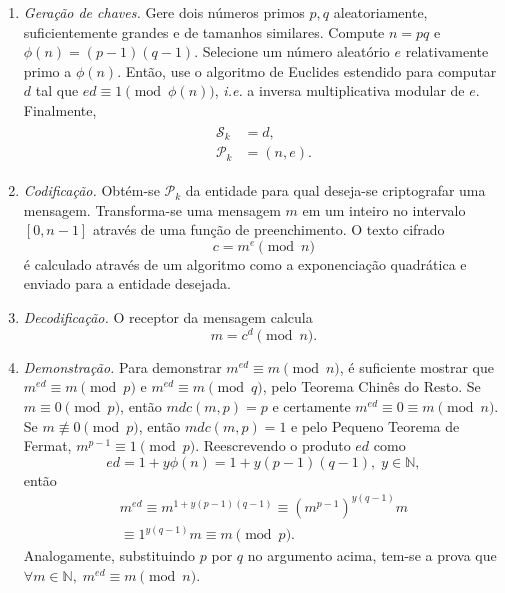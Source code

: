 \documentclass{ufsctex/ufsctex}
\newcommand{\pk}{\mathcal{P}_k}
\begin{document}
\begin{enumerate}

  \item[] \emph{Geração de chaves.} Gere dois números primos $p, q$
      aleatoriamente, suficientemente grandes e de tamanhos similares. Compute
        $n = p q$ e $\phi(n) = (p - 1) (q - 1)$. Selecione um número aleatório
        $e$ relativamente primo a $\phi(n)$. Então, use o algoritmo de Euclides
        estendido para computar $d$ tal que $ed \equiv 1 \pmod{\phi(n)}$,
        \emph{i.e.} a inversa multiplicativa modular de $e$. Finalmente,
        \begin{align}
          \begin{split}
            \mathcal{S}_k &= d, \\
            \mathcal{P}_k &= (n, e).
          \end{split}
        \end{align}

  \item[] \emph{Codificação.} Obtém-se $\pk{}$ da entidade para qual deseja-se
      criptografar uma mensagem. Transforma-se uma mensagem $m$ em um inteiro
        no intervalo $[0, n - 1]$ através de uma função de preenchimento.  O
        texto cifrado
        \begin{equation}
          c = m^e \pmod{n}
        \end{equation}
        é calculado através de um algoritmo como a exponenciação quadrática
        e enviado para a entidade desejada.

  \item[] \emph{Decodificação.} O receptor da mensagem calcula
      \begin{equation}
        m = c^d \pmod{n}.
      \end{equation}

  \item[] \emph{Demonstração.} Para demonstrar $m^{ed} \equiv m \pmod{n}$, é
      suficiente mostrar que $m^{ed} \equiv m \pmod{p}$ e $m^{ed} \equiv m
        \pmod{q}$, pelo Teorema Chinês do Resto. Se $m \equiv 0 \pmod{p}$,
        então $mdc(m, p) = p$ e certamente $m^{ed} \equiv 0 \equiv m
        \pmod{n}$.  Se $m \not\equiv 0 \pmod{p}$, então $mdc(m, p) = 1$ e pelo
        Pequeno Teorema de Fermat, $m^{p - 1} \equiv 1 \pmod{p}$. Reescrevendo
        o produto $ed$ como
        \begin{equation}
          ed = 1 + y\phi(n) = 1 + y(p - 1)(q - 1), \; y \in \mathbb{N},
        \end{equation}
        então
        \begin{multline}
          m^{ed} \equiv m^{1 + y(p-1)(q-1)} \equiv {(m^{p-1})}^{y(q-1)}m \\
            \equiv 1^{y(q-1)}m \equiv m \pmod{p}.
        \end{multline}
        Analogamente, substituindo $p$ por $q$ no argumento acima, tem-se a
        prova que $\forall m \in \mathbb{N}, \; m^{ed} \equiv m \pmod{n}$.

\end{enumerate}
\end{document}
